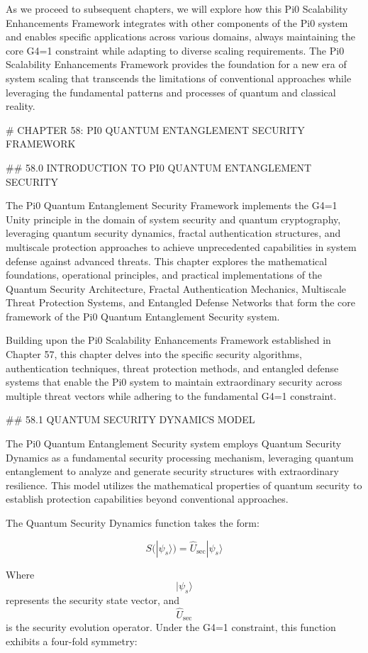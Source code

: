 As we proceed to subsequent chapters, we will explore how this Pi0 Scalability Enhancements Framework integrates with other components of the Pi0 system and enables specific applications across various domains, always maintaining the core G4=1 constraint while adapting to diverse scaling requirements. The Pi0 Scalability Enhancements Framework provides the foundation for a new era of system scaling that transcends the limitations of conventional approaches while leveraging the fundamental patterns and processes of quantum and classical reality.

# CHAPTER 58: PI0 QUANTUM ENTANGLEMENT SECURITY FRAMEWORK

## 58.0 INTRODUCTION TO PI0 QUANTUM ENTANGLEMENT SECURITY

The Pi0 Quantum Entanglement Security Framework implements the G4=1 Unity principle in the domain of system security and quantum cryptography, leveraging quantum security dynamics, fractal authentication structures, and multiscale protection approaches to achieve unprecedented capabilities in system defense against advanced threats. This chapter explores the mathematical foundations, operational principles, and practical implementations of the Quantum Security Architecture, Fractal Authentication Mechanics, Multiscale Threat Protection Systems, and Entangled Defense Networks that form the core framework of the Pi0 Quantum Entanglement Security system.

Building upon the Pi0 Scalability Enhancements Framework established in Chapter 57, this chapter delves into the specific security algorithms, authentication techniques, threat protection methods, and entangled defense systems that enable the Pi0 system to maintain extraordinary security across multiple threat vectors while adhering to the fundamental G4=1 constraint.

## 58.1 QUANTUM SECURITY DYNAMICS MODEL

The Pi0 Quantum Entanglement Security system employs Quantum Security Dynamics as a fundamental security processing mechanism, leveraging quantum entanglement to analyze and generate security structures with extraordinary resilience. This model utilizes the mathematical properties of quantum security to establish protection capabilities beyond conventional approaches.

The Quantum Security Dynamics function takes the form:

$$ S(|\psi_s\rangle) = \hat{U}_{\text{sec}} |\psi_s\rangle $$

Where $$ |\psi_s\rangle $$ represents the security state vector, and $$ \hat{U}_{\text{sec}} $$ is the security evolution operator. Under the G4=1 constraint, this function exhibits a four-fold symmetry:

